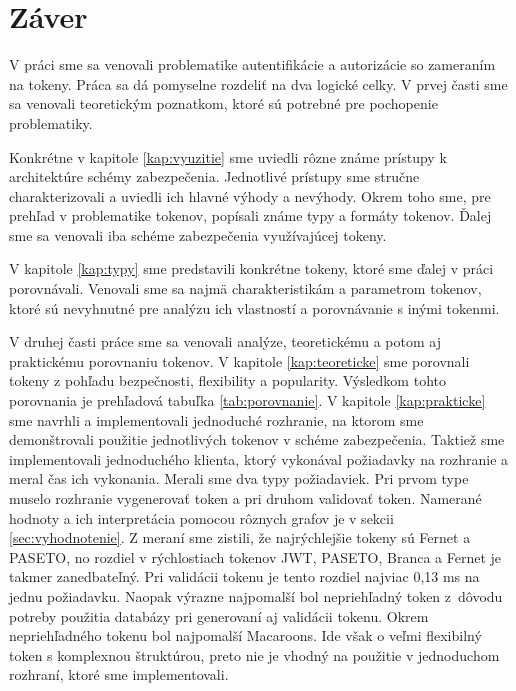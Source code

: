 \chapter*{Záver}  %

V práci sme sa venovali problematike autentifikácie a autorizácie so zameraním na tokeny. Práca sa dá pomyselne rozdeliť na dva logické celky. V prvej časti sme sa venovali teoretickým poznatkom, ktoré sú potrebné pre pochopenie problematiky. 

Konkrétne v kapitole \ref{kap:vyuzitie} sme uviedli rôzne známe prístupy k architektúre schémy zabezpečenia. Jednotlivé prístupy sme stručne charakterizovali a uviedli ich hlavné výhody a nevýhody. Okrem toho sme, pre prehľad v problematike tokenov, popísali známe typy a formáty tokenov. Ďalej sme sa venovali iba schéme zabezpečenia využívajúcej tokeny.

V kapitole \ref{kap:typy} sme predstavili konkrétne tokeny, ktoré sme ďalej v práci porovnávali. Venovali sme sa najmä charakteristikám a parametrom tokenov, ktoré sú nevyhnutné pre analýzu ich vlastností a porovnávanie s inými tokenmi.

V druhej časti práce sme sa venovali analýze, teoretickému a potom aj praktickému porovnaniu tokenov. V kapitole \ref{kap:teoreticke} sme porovnali tokeny z pohľadu bezpečnosti, flexibility a popularity. Výsledkom tohto porovnania je prehľadová tabuľka \ref{tab:porovnanie}. V kapitole \ref{kap:prakticke} sme navrhli a implementovali jednoduché rozhranie, na ktorom sme demonštrovali použitie jednotlivých tokenov v schéme zabezpečenia. Taktiež sme implementovali jednoduchého klienta, ktorý vykonával požiadavky na rozhranie a meral čas ich vykonania. Merali sme dva typy požiadaviek. Pri prvom type muselo rozhranie vygenerovať token a pri druhom validovať token. Namerané hodnoty a ich interpretácia pomocou rôznych grafov je v sekcii \ref{sec:vyhodnotenie}. Z meraní sme zistili, že najrýchlejšie tokeny sú Fernet a PASETO, no rozdiel v rýchlostiach tokenov JWT, PASETO, Branca a Fernet je takmer zanedbateľný. Pri validácii tokenu je tento rozdiel najviac 0,13 ms na jednu požiadavku. Naopak výrazne najpomalší bol nepriehľadný token z~dôvodu potreby použitia databázy pri generovaní aj validácii tokenu. Okrem nepriehľadného tokenu bol najpomalší Macaroons. Ide však o veľmi flexibilný token s komplexnou štruktúrou, preto nie je vhodný na použitie v jednoduchom rozhraní, ktoré sme implementovali.


